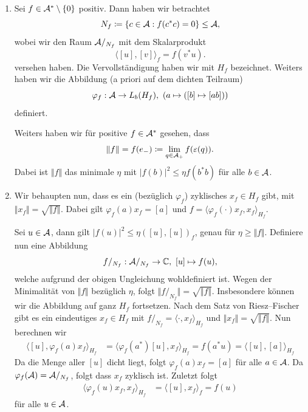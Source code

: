 \begin{remark}
\begin{enumerate}
        \item Sei $f \in \mathcal{A}^* \setminus \{ 0 \}$ positiv. Dann haben wir betrachtet
        \[
            N_f \coloneqq \{ c \in \mathcal{A} : f(c^* c) = 0 \} \leq \mathcal{A},
        \]
        wobei wir den Raum $\mathcal{A}/_{N_f}$ mit dem Skalarprodukt
        \[
            \langle [u], [v] \rangle_f = f(v^* u).
        \]
        versehen haben. Die Vervollständigung haben wir mit $H_f$ bezeichnet. Weiters haben wir die Abbildung (a priori auf dem dichten Teilraum)
        \[
            \varphi_f : \Aa \to L_b(H_f), \ (a \mapsto ([b] \mapsto [ab]))
        \]
        definiert.

        Weiters haben wir für positive $f \in \mathcal{A}^*$ gesehen, dass
        \[
            \Vert f \Vert = f(e_-) \coloneqq \lim_{q \in \mathcal{A}_+} f(\varepsilon(q)).
        \]
        Dabei ist $\Vert f \Vert$ das minimale $\eta$ mit $\vert f(b) \vert^2 \leq \eta f(b^* b)$ für alle $b \in \mathcal{A}$.

        \item Wir behaupten nun, dass es ein (bezüglich $\varphi_f$) zyklisches $x_f \in H_f$ gibt, mit $\Vert x_f \Vert = \sqrt{\Vert f \Vert}$. Dabei gilt $\varphi_f(a) x_f = [a]$ und $f = \langle \varphi_f(\cdot) x_f, x_f \rangle_{H_f}$.
        
        Sei $u \in \mathcal{A}$, dann gilt $\vert f(u) \vert^2 \leq \eta ([u], [u])_f$, genau für $\eta \geq \Vert f \Vert$. Definiere nun eine Abbildung
        \[
            f/_{N_f} : \mathcal{A}/_{N_f} \to \mathbb{C}, \ [u] \mapsto f(u),
        \]
        welche aufgrund der obigen Ungleichung wohldefiniert ist. Wegen der Minimalität von $\Vert f \Vert$ bezüglich $\eta$, folgt $\Vert f/_{N_f} \Vert = \sqrt{\Vert f \Vert}$. Insbesondere können wir die Abbildung auf ganz $H_f$ fortsetzen. Nach dem Satz von Riesz--Fischer gibt es ein eindeutiges $x_f \in H_f$ mit $f/_{N_f} = \langle \cdot, x_f \rangle_{H_f}$ und $\Vert x_f \Vert = \sqrt{\Vert f \Vert}$. Nun berechnen wir
        \begin{align*}
            \langle [u], \varphi_f(a) x_f \rangle_{H_f}
            &=
            \langle \varphi_f(a^*) [u], x_f \rangle_{H_f}
            =
            f(a^* u)
            =
            \langle [u], [a] \rangle_{H_f}
        \end{align*}
        Da die Menge aller $[u]$ dicht liegt, folgt $\varphi_f(a) x_f = [a]$ für alle $a \in \mathcal{A}$. Da $\varphi_f(\mathcal{A}) = \mathcal{A}/_{N_f}$, folgt dass $x_f$ zyklisch ist. Zuletzt folgt
        \begin{align*}
            \langle \varphi_f (u) x_f, x_f \rangle_{H_f}
            &=
            \langle [u], x_f \rangle_f = f(u)
        \end{align*}
        für alle $u \in \mathcal{A}$.


\end{enumerate}
\end{remark}
